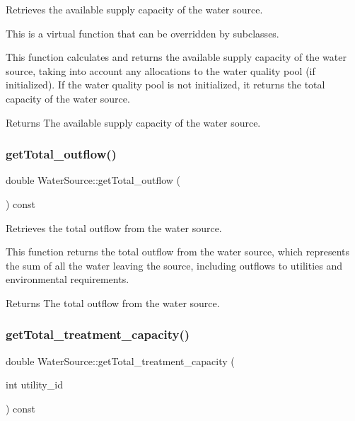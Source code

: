 Retrieves the available supply capacity of the water source. 

This is a virtual function that can be overridden by subclasses.

This function calculates and returns the available supply capacity of the water source, taking into account any allocations to the water quality pool (if initialized). If the water quality pool is not initialized, it returns the total capacity of the water source.

\begin{DoxyReturn}{Returns}
The available supply capacity of the water source. 
\end{DoxyReturn}
\mbox{\label{classWaterSource_a7678e05e3e73b927c0b47e3041d7415f}} 
\subsubsection{\texorpdfstring{get\+Total\+\_\+outflow()}{getTotal\_outflow()}}
{\footnotesize\ttfamily double Water\+Source\+::get\+Total\+\_\+outflow (\begin{DoxyParamCaption}{ }\end{DoxyParamCaption}) const}



Retrieves the total outflow from the water source. 

This function returns the total outflow from the water source, which represents the sum of all the water leaving the source, including outflows to utilities and environmental requirements.

\begin{DoxyReturn}{Returns}
The total outflow from the water source. 
\end{DoxyReturn}
\mbox{\label{classWaterSource_a6228c9aee407ca2544753dbd2792c5fb}} 
\subsubsection{\texorpdfstring{get\+Total\+\_\+treatment\+\_\+capacity()}{getTotal\_treatment\_capacity()}}
{\footnotesize\ttfamily double Water\+Source\+::get\+Total\+\_\+treatment\+\_\+capacity (\begin{DoxyParamCaption}\item[{int}]{utility\+\_\+id }\end{DoxyParamCaption}) const}



